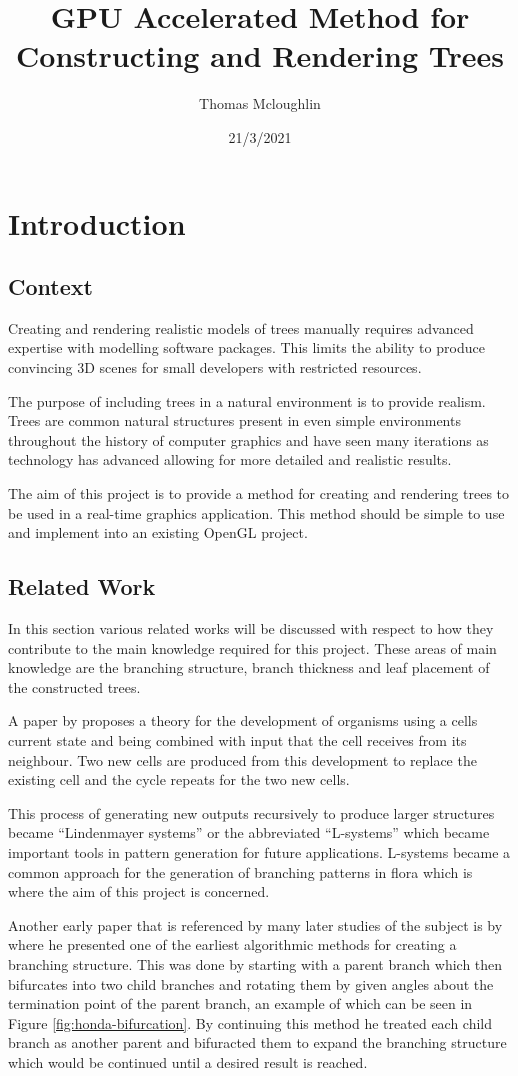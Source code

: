 \documentclass[final]{cmpreport}
\title{GPU Accelerated Method for Constructing and Rendering Trees}
\author{Thomas Mcloughlin}
\date{21/3/2021}
\begin{document}
\section{Introduction}

\subsection{Context}
Creating and rendering realistic models of trees manually requires advanced expertise 
with modelling software packages. This limits the ability to produce convincing 3D 
scenes for small developers with restricted resources.

The purpose of including trees in a natural environment is to provide realism. 
Trees are common natural structures present in even simple environments 
throughout the history of computer graphics and have seen many iterations as 
technology has advanced allowing for more detailed and realistic results.

The aim of this project is to provide a method for creating and rendering trees 
to be used in a real-time graphics application. This method should be simple to 
use and implement into an existing OpenGL project.

\subsection{Related Work}
In this section various related works will be discussed with respect to how they 
contribute to the main knowledge required for this project. These areas of main 
knowledge are the branching structure, branch thickness and leaf placement of the 
constructed trees.

A paper by \cite{lindenmayer1968mathematical} proposes a theory for the development 
of organisms using a cells current state and being combined with input that the cell 
receives from its neighbour. Two new cells are produced from this development to replace 
the existing cell and the cycle repeats for the two new cells. 

This process of generating new outputs recursively to produce larger structures became
``Lindenmayer systems'' or the abbreviated ``L-systems'' which became important tools 
in pattern generation for future applications. L-systems became a common approach for the 
generation of branching patterns in flora which is where the aim of this project is 
concerned.

Another early paper that is referenced by many later studies of the subject is by
\cite{honda1971description} where he presented one of the earliest algorithmic 
methods for creating a branching structure. This was done by starting with a parent 
branch which then bifurcates into two child branches and rotating them by given 
angles about the termination point of the parent branch, an example of which 
can be seen in Figure \ref{fig:honda-bifurcation}. By continuing this 
method he treated each child branch as another parent and bifuracted them to 
expand the branching structure which would be continued until a desired result is 
reached.
\end{document}
